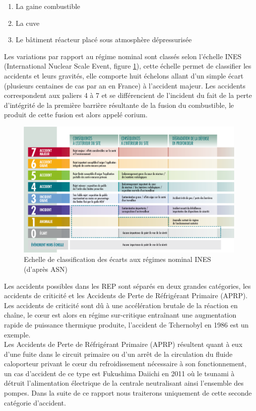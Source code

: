 \begin{enumerate}
	\item La gaine combustible
	\item La cuve
	\item Le bâtiment réacteur placé sous atmosphère dépressurisée
\end{enumerate}
Les variations par rapport au régime nominal sont classés selon l'échelle INES (International Nuclear Scale Event, figure \ref{fig:echelle-ines-article}), cette échelle permet de classifier les accidents et leurs gravités, elle comporte huit échelons allant d'un simple écart (plusieurs centaines de cas par an en France) à l'accident majeur. Les accidents correspondent aux paliers 4 à 7 et se différencient de l'incident du fait de la perte d'intégrité de la première barrière résultante de la fusion du combustible, le produit de cette fusion est alors appelé corium.
\begin{figure}[H]
	\centering
	\includegraphics[width=0.7\linewidth]{figure/echelle-ines-article}
	\caption[Echelle de classification des écarts aux régimes nominal INES]{Echelle de classification des écarts aux régimes nominal INES (d'après ASN)}
	\label{fig:echelle-ines-article}
\end{figure}
Les accidents possibles dans les REP sont séparés en deux grandes catégories, les accidents de criticité et les Accidents de Perte de Réfrigérant Primaire (APRP). Les accidents de criticité sont dû à une accélération brutale de la réaction en chaîne, le c\oe ur est alors en régime sur-critique entraînant une augmentation rapide de puissance thermique produite, l'accident de Tchernobyl en 1986 est un exemple.\\ Les Accidents de Perte de Réfrigérant Primaire (APRP) résultent quant à eux d'une fuite dans le circuit primaire ou d'un arrêt de la circulation du fluide caloporteur privant le c\oe ur du refroidissement nécessaire à son fonctionnement, un cas d'accident de ce type est Fukushima Daiichi en 2011 où le tsunami à détruit l'alimentation électrique de la centrale neutralisant ainsi l'ensemble des pompes. Dans la suite de ce rapport nous traiterons uniquement de cette seconde catégorie d'accident.
